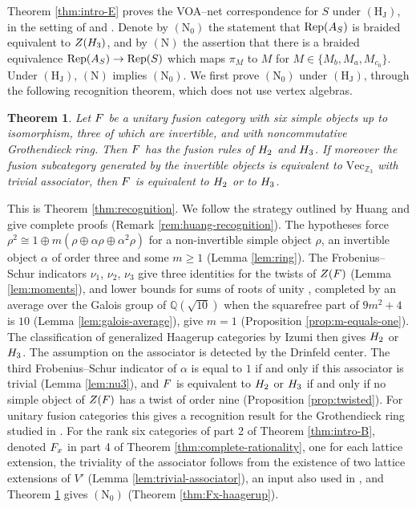 \documentclass[leqno]{article}
\let\cal\relax
\newcommand{\cal}{\mathcal}
\newcommand{\Z}{\ensuremath{\mathbb{Z}}}
\renewcommand{\geq}{\ensuremath{\geqslant}}
\DeclareMathOperator{\Rep}{Rep} %
\newtheorem{thm}{Theorem}[section]
\numberwithin{equation}{section}
\begin{document}
Theorem \ref{thm:intro-E} proves the VOA--net correspondence for $S$ under $\mathrm{(H_J)}$, in the setting of \cite[Conjecture 7.6 p.~14]{Kaw18} and \cite{Gui26,Gui25,Ten24}. Denote by $\mathrm{(N_0)}$ the statement that $\Rep(\cal A_S)$ is braided equivalent to $Z(\cal H_3)$, and by $\mathrm{(N)}$ the assertion that there is a braided equivalence $\Rep(\cal A_S) \to \Rep(S)$ which maps $\pi_M$ to $M$ for $M \in \{M_b,M_a,M_{c_0}\}$. Under $\mathrm{(H_J)}$, $\mathrm{(N)}$ implies $\mathrm{(N_0)}$. We first prove $\mathrm{(N_0)}$ under $\mathrm{(H_J)}$, through the following recognition theorem, which does not use vertex algebras.

\begin{thm}
\label{thm:intro-D}
Let $\cal F$ be a unitary fusion category with six simple objects up to isomorphism, three of which are invertible, and with noncommutative Grothendieck ring. Then $\cal F$ has the fusion rules of $\cal H_2$ and $\cal H_3$. If moreover the fusion subcategory generated by the invertible objects is equivalent to $\mathrm{Vec}_{\Z_3}$ with trivial associator, then $\cal F$ is equivalent to $\cal H_2$ or to $\cal H_3$.
\end{thm}

This is Theorem \ref{thm:recognition}. We follow the strategy outlined by Huang \cite[Sections 5 and 6 pp.~7--9]{Hua26} and give complete proofs (Remark \ref{rem:huang-recognition}). The hypotheses force $\rho^2 \cong 1 \oplus m(\rho \oplus \alpha\rho \oplus \alpha^2\rho)$ for a non-invertible simple object $\rho$, an invertible object $\alpha$ of order three and some $m \geq 1$ (Lemma \ref{lem:ring}). The Frobenius--Schur indicators $\nu_1$, $\nu_2$, $\nu_3$ \cite{NS07,NS07b} give three identities for the twists of $Z(\cal F)$ (Lemma \ref{lem:moments}), and lower bounds for sums of roots of unity \cite{Lar14}, completed by an average over the Galois group of $\mathbb{Q}(\sqrt{10})$ when the squarefree part of $9m^2+4$ is $10$ (Lemma \ref{lem:galois-average}), give $m = 1$ (Proposition \ref{prop:m-equals-one}). The classification of generalized Haagerup categories by Izumi \cite{Izu18} then gives $\cal H_2$ or $\cal H_3$. The assumption on the associator is detected by the Drinfeld center. The third Frobenius--Schur indicator of $\alpha$ is equal to $1$ if and only if this associator is trivial (Lemma \ref{lem:nu3}), and $\cal F$ is equivalent to $\cal H_2$ or $\cal H_3$ if and only if no simple object of $Z(\cal F)$ has a twist of order nine (Proposition \ref{prop:twisted}). For unitary fusion categories this gives a recognition result for the Grothendieck ring studied in \cite[p.~5]{GrS12}. For the rank six categories of part 2 of Theorem \ref{thm:intro-B}, denoted $\cal F_x$ in part 4 of Theorem \ref{thm:complete-rationality}, one for each lattice extension, the triviality of the associator follows from the existence of two lattice extensions of $V'$ (Lemma \ref{lem:trivial-associator}), an input also used in \cite[p.~7]{Hua26}, and Theorem \ref{thm:intro-D} gives $\mathrm{(N_0)}$ (Theorem \ref{thm:Fx-haagerup}).
\end{document}
